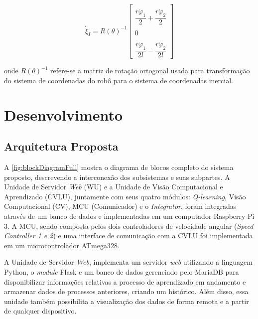 \documentclass[a4paper]{ifacconf}
\begin{document}
\begin{equation}
\dot{\xi}_{I}=R(\theta)^{-1}
\begin{bmatrix}
\\ \dfrac{r\dot{\varphi}_{1}}{2}+\dfrac{r\dot{\varphi}_{2}}{2}\\
\\0 \\
\\ \dfrac{r\dot{\varphi}_{1}}{2l}-\dfrac{r\dot{\varphi}_{2}}{2l}
\end{bmatrix}
\end{equation}

onde $R(\theta)^{-1}$ refere-se a matriz de rotação ortogonal usada para transformação do sistema de coordenadas do robô para o sistema de coordenadas inercial. 

\section{Desenvolvimento}

\subsection{Arquitetura Proposta}



A \autoref{fig:blockDiagramFull} mostra o diagrama de blocos completo do sistema proposto, descrevendo a interconexão dos subsistemas e suas subpartes. A Unidade de Servidor \textit{Web} (WU) e a Unidade de Visão Computacional e Aprendizado (CVLU), juntamente com seus quatro módulos: \textit{Q-learning}, Visão Computacional (CV), MCU (Comunicador) e o \textit{Integrator}, foram integradas através de um banco de dados e implementadas em um computador Raspberry Pi 3. A MCU, sendo composta pelos dois controladores de velocidade angular (\textit{Speed Controller 1 e 2}) e uma interface de comunicação com a CVLU foi implementada em um microcontrolador ATmega328. 

A Unidade de Servidor \textit{Web}, implementa um servidor \textit{web} utilizando a linguagem Python, o \textit{module} Flask e um banco de dados gerenciado pelo MariaDB para disponibilizar informações relativas a processo de aprendizado em andamento e armazenar dados de processos anteriores, criando um histórico. Além disso, essa unidade também possibilita a visualização dos dados de forma remota e a partir de qualquer dispositivo. 
\end{document}
